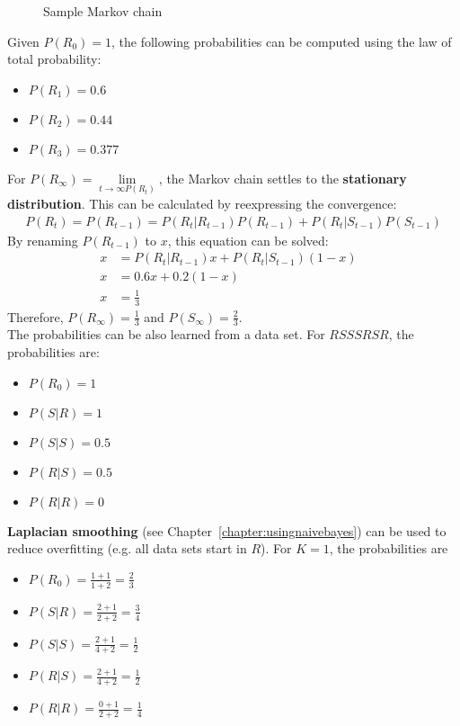 \documentclass{report}
\begin{document}
\begin{figure}[h!]
\centering
{}
\caption{Sample Markov chain}
\label{ref:samplemarkovchain}
\end{figure}

Given $P(R_0)=1$, the following probabilities can be computed using the law of total probability:
\begin{itemize}
\item $P(R_1)=0.6$
\item $P(R_2)=0.44$
\item $P(R_3)=0.377$
\end{itemize}

For $P(R_\infty)=\lim\limits_{t \rightarrow \infty P(R_t)}$, the Markov chain settles to the {\bf stationary distribution}. This can be calculated by reexpressing the convergence:
\begin{align*}
P(R_t) = P(R_{t-1}) = P(R_t\vert R_{t-1})P(R_{t-1}) + P(R_t\vert S_{t-1})P(S_{t-1})
\end{align*}
By renaming $P(R_{t-1})$ to $x$, this equation can be solved:
\begin{align*}
x &= P(R_t\vert R_{t-1})x + P(R_t\vert S_{t-1})(1-x) &\\
x &= 0.6x + 0.2(1-x) \\
x &= \frac{1}{3}
\end{align*}
Therefore, $P(R_\infty)=\frac{1}{3}$ and $P(S_\infty)=\frac{2}{3}$. \\
The probabilities can be also learned from a data set. For $RSSSRSR$, the probabilities are:
\begin{itemize}
\item $P(R_0)=1$
\item $P(S\vert R)=1$
\item $P(S\vert S)=0.5$
\item $P(R\vert S)=0.5$
\item $P(R\vert R)=0$
\end{itemize}
{\bf Laplacian smoothing} (see Chapter~\ref{chapter:usingnaivebayes}) can be used to reduce overfitting (e.g. all data sets start in $R$). For $K=1$, the probabilities are
\begin{itemize}
\item $P(R_0)=\frac{1+1}{1+2}=\frac{2}{3}$
\item $P(S\vert R)=\frac{2+1}{2+2}=\frac{3}{4}$
\item $P(S\vert S)=\frac{2+1}{4+2}=\frac{1}{2}$
\item $P(R\vert S)=\frac{2+1}{4+2}=\frac{1}{2}$
\item $P(R\vert R)=\frac{0+1}{2+2}=\frac{1}{4}$
\end{itemize}
\end{document}
